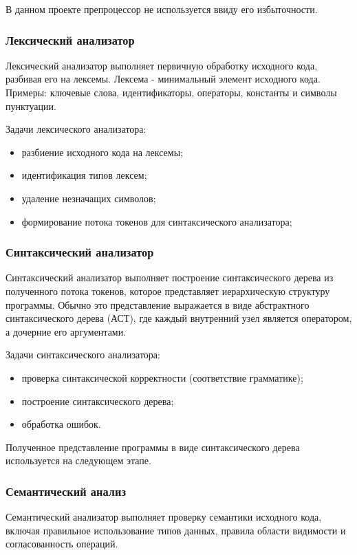 В данном проекте препроцессор не используется ввиду его избыточности.

\subsubsection{Лексический анализатор}
Лексический анализатор выполняет первичную обработку исходного кода, разбивая его на лексемы. Лексема - минимальный элемент исходного кода. Примеры: ключевые слова, идентификаторы, операторы, константы и символы пунктуации.

Задачи лексического анализатора:
\begin{itemize}
    \item разбиение исходного кода на лексемы;
    \item идентификация типов лексем;
    \item удаление незначащих символов;
    \item формирование потока токенов для синтаксического анализатора;
\end{itemize}

\subsubsection{Синтаксический анализатор}

Синтаксический анализатор выполняет построение синтаксического дерева из полученного потока токенов, которое представляет иерархическую структуру программы. Обычно это представление выражается в виде абстрактного синтаксического дерева (АСТ), где каждый внутренний узел является оператором, а дочерние его аргументами.

Задачи синтаксического анализатора:
\begin{itemize}
    \item проверка синтаксической корректности (соответствие грамматике);
    \item построение синтаксического дерева;
    \item обработка ошибок.
\end{itemize}

Полученное представление программы в виде синтаксического дерева используется на следующем этапе. 

\subsubsection{Семантический анализ}
Семантический анализатор выполняет проверку семантики исходного кода, включая правильное использование типов данных, правила области видимости и согласованность операций. 


